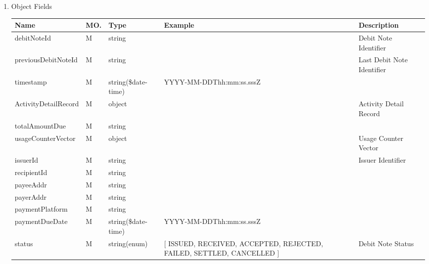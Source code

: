 \begin{enumerate}
\begin{enumerate}
\item Object Fields

\begin{table}[H]
\footnotesize

\begin{center}
\begin{tabular}{|p{3cm}|l|p{3cm}|p{3cm}|p{4cm}|} 
\hline
\rowcolor{lightgray}	Name	& MO.	& Type	& Example & 	Description \\
\hline

debitNoteId 			& M & string 				&  							&  Debit Note Identifier \\
\hline	

previousDebitNoteId 	& M & string 				&  							&  Last Debit Note Identifier \\
\hline	

timestamp 				& M & string(\$date-time) 	&  YYYY-MM-DDThh:mm:ss.sssZ	&  \\
\hline

ActivityDetailRecord	& M & object 				&  							&  Activity Detail Record \\
\hline	

totalAmountDue 			& M & string 				&  							&   \\
\hline

usageCounterVector		& M & object				&							&  Usage Counter Vector \\
\hline

issuerId				& M &  string				&							& Issuer Identifier \\
\hline

recipientId				& M & string 				&  							&   \\
\hline

payeeAddr				& M & string 				&  							&   \\
\hline

payerAddr				& M & string 				&  							&   \\
\hline

paymentPlatform			& M & string 				&  							&   \\
\hline

paymentDueDate			& M & string(\$date-time) 	&  YYYY-MM-DDThh:mm:ss.sssZ	&  \\
\hline

status					& M & string(enum)			& [ ISSUED, RECEIVED, ACCEPTED, REJECTED, FAILED, SETTLED, CANCELLED ] & Debit Note Status \\
\hline
			
\end{tabular}
\end{center}
\end{table}


\end{enumerate}
\end{enumerate}
